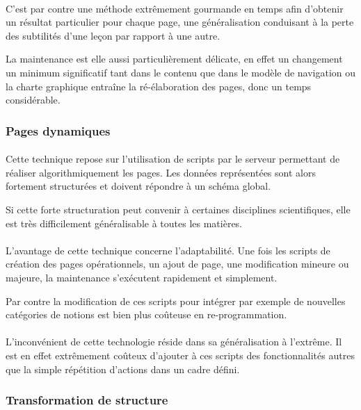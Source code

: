 \paragraph{}C'est par contre une méthode extrêmement gourmande en temps afin d'obtenir un résultat particulier pour chaque page, une généralisation conduisant à la perte des subtilités d'une leçon par rapport à une autre. 

La maintenance est elle aussi particulièrement délicate, en effet un changement un minimum significatif tant dans le contenu que dans le modèle de navigation ou la charte graphique entraîne la ré-élaboration des pages, donc un temps considérable. 

\subsubsection{Pages dynamiques}
\paragraph{}Cette technique repose sur l'utilisation de scripts par le serveur permettant de réaliser algorithmiquement les pages. Les données représentées sont alors fortement structurées et doivent répondre à un schéma global. 

Si cette forte structuration peut convenir à certaines disciplines scientifiques, elle est très difficilement généralisable à toutes les matières.

\paragraph{}L'avantage de cette technique concerne l'adaptabilité. Une fois les scripts de création des pages opérationnels, un ajout de page, une modification mineure ou majeure, la maintenance s'exécutent rapidement et simplement. 

Par contre la modification de ces scripts pour intégrer par exemple de nouvelles catégories de notions est bien plus coûteuse en re-programmation.

\paragraph{}L'inconvénient de cette technologie réside dans sa généralisation à l'extrême. Il est en effet extrêmement coûteux d'ajouter à ces scripts des fonctionnalités autres que la simple répétition d'actions dans un cadre défini.

\subsubsection{Transformation de structure}
